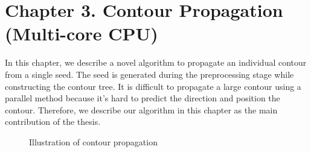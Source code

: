 \documentclass[11pt, b5paper]{report}
\begin{document}


% 
\chapter*{Chapter 3. Contour Propagation (Multi-core CPU)}
\setcounter{tocdepth}{0}
\setcounter{chapter}{3}
\setcounter{section}{0}
\label{ch:prop}

In this chapter, we describe a novel algorithm to propagate an individual 
contour from a single seed. The seed is generated during the preprocessing
stage while constructing the contour tree. It is difficult to propagate
a large contour using a parallel method because it's hard to predict the
direction and position the contour. Therefore, we describe our algorithm in
this chapter as the main contribution of the thesis.


\begin{figure}[htb]
  \centering
  \vspace{20pt}
  \vspace{20pt}
  \caption{Illustration of contour propagation}
  \label{fig:contourpropagation}
\end{figure}
\end{document}
